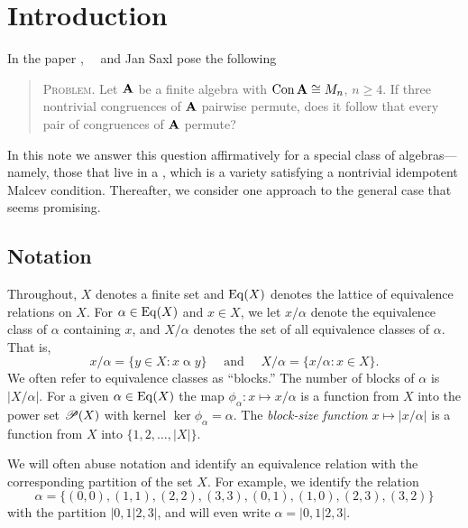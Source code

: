 \section{Introduction}
In the paper \cite{PalfySaxl}, \Peter\ \Palfy\ and Jan Saxl pose 
the following 
\begin{quote}
  {\scshape Problem.}
  Let $\mathbf{A}$ be a finite algebra with $\operatorname{Con} \mathbf{A} \cong M_n$, $n\geq
  4$. If three nontrivial congruences of $\mathbf{A}$ pairwise permute, does it follow
  that every pair of congruences of $\mathbf{A}$ permute?
\end{quote}
In this note we answer this question affirmatively for a special class of
algebras---namely, those that live in a , which is a variety 
satisfying a nontrivial idempotent Malcev condition.  Thereafter, we consider
one approach to the general case that seems promising.


\subsection{Notation}
Throughout, $X$ denotes a finite set and $\operatorname{Eq}(X)$ denotes the lattice of
equivalence relations on $X$. For $\alpha \in \operatorname{Eq}(X)$ and $x\in X$, we
let $x/\alpha$ denote the equivalence class of $\alpha$ containing $x$, and 
$X/\alpha$ denotes the set of all equivalence classes of $\alpha$. That is,
\[
x/\alpha = \{y\in X : x \mathrel{ \alpha } y\} \quad \text{ and } \quad
X/\alpha = \{x/\alpha : x\in X \}.
\]
We often refer to equivalence classes as
``blocks.''  The number of blocks of $\alpha$ is $|X/\alpha|$.
For a given $\alpha\in \operatorname{Eq}(X)$ the map 
 $\phi_\alpha: x \mapsto x/\alpha$ is a
function from $X$ into the power set $\mathscr{P}(X)$
with kernel $\ker \phi_\alpha = \alpha$. 
The \emph{block-size function} $x \mapsto |x/\alpha|$ is a function from $X$ into $\{1,2,\dots, |X|\}$.

We will often abuse notation and identify an equivalence relation with the
corresponding partition of the set $X$.  For example, we identify
the relation 
\[
\alpha = \{(0,0), (1,1), (2,2), (3,3), (0,1), (1,0), (2,3), (3,2)\}
\]
with the partition $|0,1|2,3|$, and will even write $\alpha = |0,1|2,3|$. 

